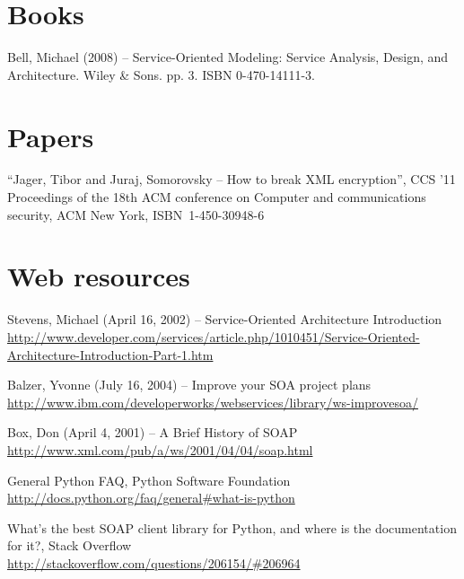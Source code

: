 

%
%

%
%


\begin{thebibliography}{99}

\section*{Books}

Bell, Michael (2008) -- Service-Oriented Modeling: Service Analysis, Design, and Architecture. Wiley & Sons. pp. 3. ISBN 0-470-14111-3.

\section*{Papers}

``Jager, Tibor and Juraj, Somorovsky -- How to break XML encryption'',
CCS '11 Proceedings of the 18th ACM conference on Computer and communications security,
ACM New York, \mbox{ISBN 1-450-30948-6}

\section*{Web resources}

Stevens, Michael (April 16, 2002) -- Service-Oriented Architecture Introduction
\url{http://www.developer.com/services/article.php/1010451/Service-Oriented-Architecture-Introduction-Part-1.htm}

Balzer, Yvonne (July 16, 2004) -- Improve your SOA project plans\\
\url{http://www.ibm.com/developerworks/webservices/library/ws-improvesoa/}

Box, Don (April 4, 2001) -- A Brief History of SOAP\\
\url{http://www.xml.com/pub/a/ws/2001/04/04/soap.html}


General Python FAQ, Python Software Foundation\\
\url{http://docs.python.org/faq/general#what-is-python}

What's the best SOAP client library for Python, and where is the documentation for it?, Stack Overflow\\
\url{http://stackoverflow.com/questions/206154/#206964}


\end{thebibliography}
